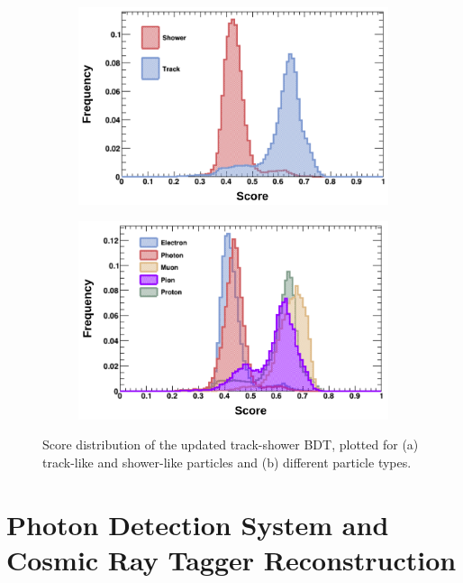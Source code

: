 \begin{figure}[htbp!]
        \centering
        \begin{subfigure}[b]{0.495\textwidth}
            \centering
            \includegraphics[width=\textwidth]{bdt_score_trk_shw}
            \caption{}%
        \end{subfigure}
        \hfill
        \begin{subfigure}[b]{0.495\textwidth}  
            \centering 
            \includegraphics[width=\textwidth]{bdt_score_particle}
            \caption{}%
        \end{subfigure}
        \caption[Score Distributions of the Updated Track-Shower Separation BDT]{
	Score distribution of the updated track-shower BDT, plotted for (a) track-like and shower-like particles and (b) different particle types.
	}
        \label{fig:bdt_score}
\end{figure}

\section{Photon Detection System and Cosmic Ray Tagger Reconstruction}
\label{sec:reco_others}

